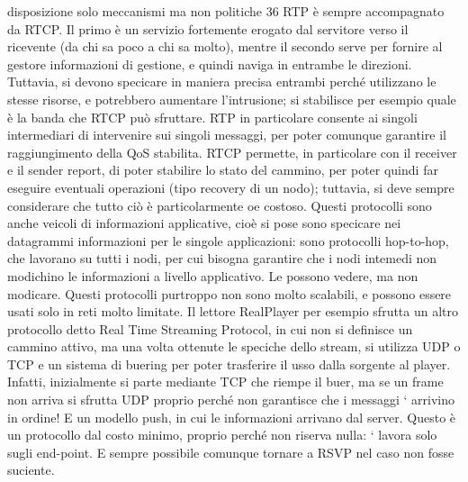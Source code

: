 disposizione solo meccanismi ma non politiche
36
RTP è sempre accompagnato da RTCP. Il primo è un servizio fortemente
erogato dal servitore verso il ricevente (da chi sa poco a chi sa molto), mentre
il secondo serve per fornire al gestore informazioni di gestione, e quindi naviga
in entrambe le direzioni. Tuttavia, si devono specicare in maniera precisa entrambi perché utilizzano le stesse risorse,
e potrebbero aumentare l'intrusione;
si stabilisce per esempio quale è la banda che RTCP può sfruttare. RTP in
particolare consente ai singoli intermediari di intervenire sui singoli messaggi,
per poter comunque garantire il raggiungimento della QoS stabilita. RTCP permette, in particolare con il receiver e il
sender report, di poter stabilire lo stato
del cammino, per poter quindi far eseguire eventuali operazioni (tipo recovery
di un nodo); tuttavia, si deve sempre considerare che tutto ciò è particolarmente
oe
costoso.
Questi protocolli sono anche veicoli di informazioni applicative, cioè si pose
sono specicare nei datagrammi informazioni per le singole applicazioni: sono
protocolli hop-to-hop, che lavorano su tutti i nodi, per cui bisogna garantire che
i nodi intemedi non modichino le informazioni a livello applicativo. Le possono
vedere, ma non modicare.
Questi protocolli purtroppo non sono molto scalabili, e possono essere usati
solo in reti molto limitate. Il lettore RealPlayer per esempio sfrutta un altro
protocollo detto Real Time Streaming Protocol, in cui non si definisce un cammino attivo, ma una volta ottenute le
speciche dello stream, si utilizza UDP
o TCP e un sistema di buering per poter trasferire il usso dalla sorgente al
player. Infatti, inizialmente si parte mediante TCP che riempe il buer, ma se
un frame non arriva si sfrutta UDP proprio perché non garantisce che i messaggi
`
arrivino in ordine! E un modello push, in cui le informazioni arrivano dal server. Questo è un protocollo dal costo
minimo, proprio perché non riserva nulla:
`
lavora solo sugli end-point. E sempre possibile comunque tornare a RSVP nel
caso non fosse suciente.
